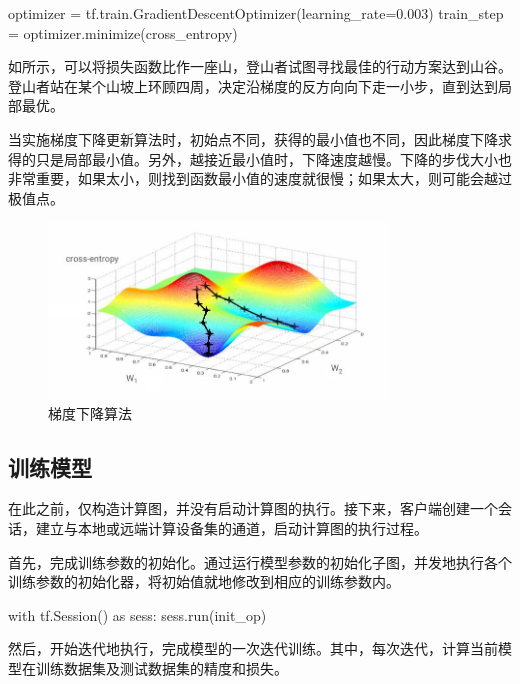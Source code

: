 \begin{content}
\begin{leftbar}
\begin{python}
optimizer = tf.train.GradientDescentOptimizer(learning_rate=0.003)
train_step = optimizer.minimize(cross_entropy)
\end{python}
\end{leftbar}

如所示，可以将损失函数比作一座山，登山者试图寻找最佳的行动方案达到山谷。登山者站在某个山坡上环顾四周，决定沿梯度的反方向向下走一小步，直到达到局部最优。

当实施梯度下降更新算法时，初始点不同，获得的最小值也不同，因此梯度下降求得的只是局部最小值。另外，越接近最小值时，下降速度越慢。下降的步伐大小也非常重要，如果太小，则找到函数最小值的速度就很慢；如果太大，则可能会越过极值点。

\begin{figure}[H]
\centering
\includegraphics[width=0.8\textwidth]{figures/mnist-gd.jpeg}
\caption{梯度下降算法}
 \label{fig:mnist-gd}
\end{figure}

\subsection{训练模型}

在此之前，\tf{}仅构造计算图，并没有启动计算图的执行。接下来，客户端创建一个会话，建立与本地或远端计算设备集的通道，启动计算图的执行过程。

首先，完成训练参数的初始化。通过运行模型参数的初始化子图，并发地执行各个训练参数的初始化器，将初始值就地修改到相应的训练参数内。

\begin{leftbar}
\begin{python}
with tf.Session() as sess:
  sess.run(init_op)
\end{python}
\end{leftbar}

然后，开始迭代地执行，完成模型的一次迭代训练。其中，每次迭代，计算当前模型在训练数据集及测试数据集的精度和损失。


\end{content}
